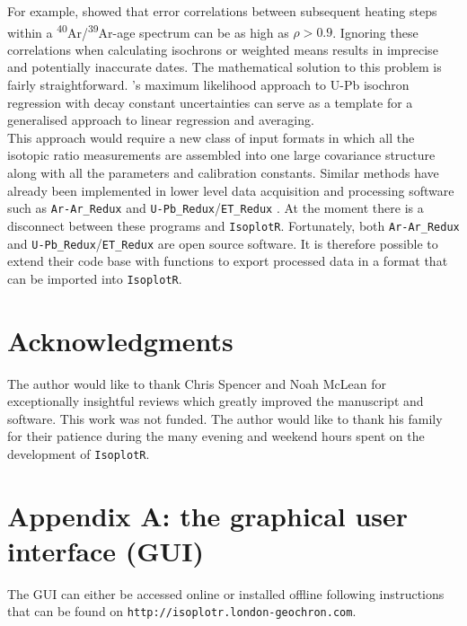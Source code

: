 \documentclass{article}
\begin{document}
For example, \citet{vermeesch2015b} showed that error correlations
between subsequent heating steps within a
\textsuperscript{40}Ar/\textsuperscript{39}Ar-age spectrum can be as
high as $\rho > 0.9$. Ignoring these correlations when calculating
isochrons or weighted means results in imprecise and potentially
inaccurate dates. The mathematical solution to this problem is fairly
straightforward. \citet{ludwig1998}'s maximum likelihood approach to
U-Pb isochron regression with decay constant uncertainties can serve
as a template for a generalised approach to linear regression and
averaging.\\

This approach would require a new class of input formats in which all
the isotopic ratio measurements are assembled into one large
covariance structure along with all the parameters and calibration
constants. Similar methods have already been implemented in lower
level data acquisition and processing software such as
\texttt{Ar-Ar\_Redux} \citep{vermeesch2015b} and
\texttt{U-Pb\_Redux}/\texttt{ET\_Redux} \citep{bowring2011,
  mclean2016}. At the moment there is a disconnect between these
programs and \texttt{IsoplotR}. Fortunately, both
\texttt{Ar-Ar\_Redux} and \texttt{U-Pb\_Redux}/\texttt{ET\_Redux} are
open source software. It is therefore possible to extend their code
base with functions to export processed data in a format that can be
imported into \texttt{IsoplotR}.

\section*{Acknowledgments}

The author would like to thank Chris Spencer and Noah McLean for
exceptionally insightful reviews which greatly improved the manuscript
and software.  This work was not funded. The author would like to
thank his family for their patience during the many evening and
weekend hours spent on the development of \texttt{IsoplotR}.

\renewcommand\thefigure{A.\arabic{figure}}    
\setcounter{figure}{0}
\section*{Appendix A: the graphical user interface (GUI)}

The GUI can either be accessed online or installed offline following
instructions that can be found on
\texttt{http://isoplotr.london-geochron.com}.
\end{document}
